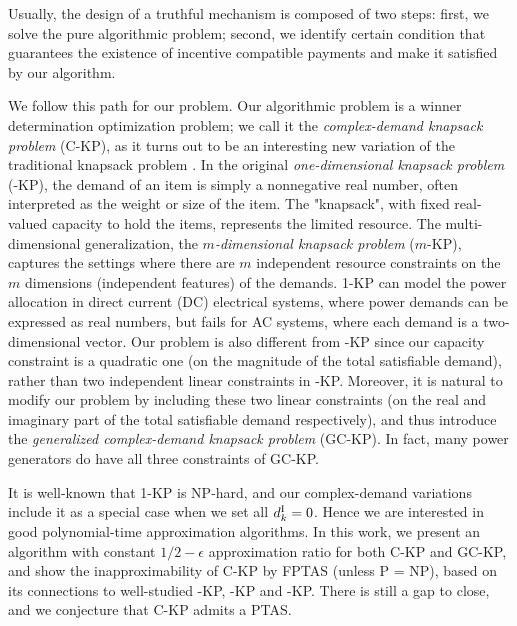 \documentclass{aamas2013}
\begin{document}
Usually, the design of a truthful mechanism is composed of two steps: first, we solve the pure algorithmic problem; second, we identify certain condition that guarantees the existence of incentive compatible payments and make it satisfied by our algorithm.  

We follow this path for our problem.  Our algorithmic problem is a winner determination optimization problem; we call it the {\em complex-demand knapsack problem} ({\sc C-KP}), as it turns out to be an interesting new variation of the traditional knapsack problem \cite{KPP10book}.  In the original {\em one-dimensional knapsack problem} ({-KP}), the demand of an item is simply a nonnegative real number, often interpreted as the weight or size of the item.  The "knapsack", with fixed real-valued capacity to hold the items, represents the limited resource.  The multi-dimensional generalization, the {\em $m$-dimensional knapsack problem} ({\sc $m$-KP}), captures the settings where there are $m$ independent resource constraints on the $m$ dimensions (independent features) of the demands.  1-KP can model the power allocation in direct current (DC) electrical systems, where power demands can be expressed as real numbers, but fails for AC systems, where each demand is a two-dimensional vector.  Our problem is also different from {-KP} since our capacity constraint is a quadratic one (on the magnitude of the total satisfiable demand), rather than two independent linear constraints in {-KP}.  Moreover, it is natural to modify our problem by including these two linear constraints (on the real and imaginary part of the total satisfiable demand respectively), and thus introduce the {\em generalized complex-demand knapsack problem} ({\sc GC-KP}).  In fact, many power generators do have all three constraints of GC-KP.     

It is well-known that 1-KP is NP-hard, and our complex-demand variations include it as a special case when we set all $d^{\rm I}_k=0$.  
Hence we are interested in good polynomial-time approximation algorithms.  In this work, we present an algorithm with constant $1/2-\epsilon$ approximation ratio for both {\sc C-KP} and {\sc GC-KP}, and show the inapproximability of {\sc C-KP} by FPTAS (unless P = NP), based on its connections to well-studied {-KP}, {-KP} and {-KP}.  There is still a gap to close, and we conjecture that {\sc C-KP} admits a PTAS.



 
\end{document}
